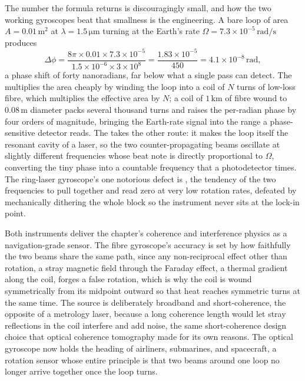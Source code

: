 

The number the formula returns is discouragingly small, and how the two working
gyroscopes beat that smallness is the engineering. A bare loop of area
$A = 0.01\,\si{\meter\squared}$ at $\lambda = 1.5\,\si{\micro\meter}$ turning at
the Earth's rate $\Omega = 7.3\times 10^{-5}\,\si{\radian\per\second}$ produces
\[
\Delta\phi = \frac{8\pi\times 0.01\times 7.3\times 10^{-5}}
{1.5\times 10^{-6}\times 3\times 10^{8}}
= \frac{1.83\times 10^{-5}}{450}
= 4.1\times 10^{-8}\,\si{\radian},
\]
a phase shift of forty nanoradians, far below what a single pass can detect. The
 multiplies the area cheaply by winding the loop
into a coil of $N$ turns of low-loss fibre, which multiplies the effective area
by $N$; a coil of $1\,\si{\kilo\meter}$ of fibre wound to
$0.08\,\si{\meter}$ diameter packs several thousand turns and raises the
per-radian phase by four orders of magnitude, bringing the Earth-rate signal
into the range a phase-sensitive detector reads. The  takes the other route: it makes the loop itself the resonant cavity
of a laser, so the two counter-propagating beams oscillate at slightly different
frequencies whose beat note is directly proportional to $\Omega$, converting the
tiny phase into a countable frequency that a photodetector times. The ring-laser
gyroscope's one notorious defect is , the tendency of the two
frequencies to pull together and read zero at very low rotation rates, defeated
by mechanically dithering the whole block so the instrument never sits at the
lock-in point.

Both instruments deliver the chapter's coherence and interference physics as a
navigation-grade sensor. The fibre gyroscope's accuracy is set by how faithfully
the two beams share the same path, since any non-reciprocal effect other than
rotation, a stray magnetic field through the Faraday effect, a thermal gradient
along the coil, forges a false rotation, which is why the coil is wound
symmetrically from its midpoint outward so that heat reaches symmetric turns at
the same time. The source is deliberately broadband and short-coherence, the
opposite of a metrology laser, because a long coherence length would let stray
reflections in the coil interfere and add noise, the same short-coherence design
choice that optical coherence tomography made for its own reasons. The optical
gyroscope now holds the heading of airliners, submarines, and spacecraft, a
rotation sensor whose entire principle is that two beams around one loop no
longer arrive together once the loop turns.

